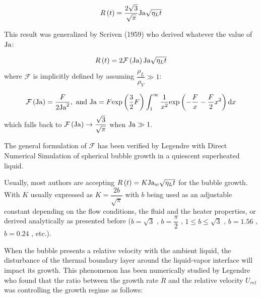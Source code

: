 \begin{equation}
R\left( t \right) = \frac{2\sqrt{3}}{\sqrt{\pi}}\mathrm{Ja}\sqrt{\eta_{L}t}
\label{eq:growth_plesset}
\end{equation}

This result was generalized by Scriven (1959) \cite{scriven_dynamics_1959} who derived whatever the value of $\mathrm{Ja}$:

\begin{equation}
R\left( t \right) = 2 \mathcal{F}\left( \mathrm{Ja} \right)\mathrm{Ja}\sqrt{\eta_{L}t}
\label{eq:growth_scriven}
\end{equation} 
where $\mathcal{F}$ is implicitly defined by assuming $\dfrac{\rho_{L}}{\rho_{V}} \gg 1$:

\begin{equation}
\mathcal{F}\parth{\Ja}=\frac{F}{2\Ja^{2}},\ \text{and}\ \Ja = F\exp{\frac{3}{2}F} \int_{1}^{\infty}\frac{1}{x^{2}}\exp{-\frac{F}{x}-\frac{F}{2}x^{2}}\mathrm{d}x
\end{equation}
which falls back to $\mathcal{F}\left( \mathrm{Ja} \right) \to \dfrac{\sqrt{3}}{\sqrt{\pi}}$ when $\mathrm{Ja} \gg 1$.

\npar
The general formulation of $\mathcal{F}$ has been verified by Legendre \etal \cite{legendre_thermal_1998} with Direct Numerical Simulation of spherical bubble growth in a quiescent superheated liquid.

\npar

Usually, most authors are accepting $R\left( t \right) = K \mathrm{Ja}_{w} \sqrt{\eta_{L}t}$ for the bubble growth. With $K$ usually expressed as $K=\dfrac{2b}{\sqrt{\pi}}$ with $b$ being used as an adjustable constant depending on the flow conditions, the fluid and the heater properties, or derived analytically as presented before ($b=\sqrt{3}$ \cite{plesset_growth_1954}, $b=\dfrac{\pi}{2}$ \cite{forster_growth_1954}, $1 \leq b \leq \sqrt{3}$ \cite{zuber_dynamics_1961}, $b=1.56$ \cite{yun_prediction_2012}, $b=0.24$ \cite{yoo_development_2018}, etc.).

\npar

When the bubble presents a relative velocity with the ambient liquid, the disturbance of the thermal boundary layer around the liquid-vapor interface will impact its growth. This phenomenon has been numerically studied by Legendre \etal \cite{legendre_thermal_1998} who found that the ratio between the growth rate $\dot{R}$ and the relative velocity $U_{rel}$ was controlling the growth regime as follows:

